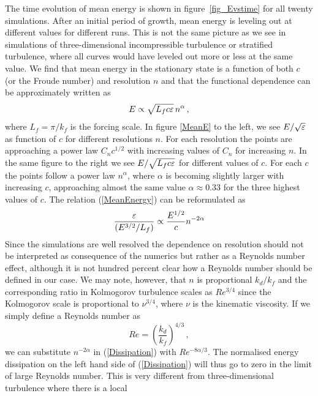 The time evolution of mean energy is shown in figure~\ref{fig_Evstime} for all
twenty simulations. After an initial period of growth, mean energy is leveling
out at different values for different runs. This is not the same picture as we
see in simulations of three-dimensional incompressible turbulence or stratified
turbulence, where all curves would have leveled out more or less at the same
value. We find that mean energy in the stationary state is a function of both $
c $ (or the Froude number) and resolution $ n $ and that the functional
dependence can be approximately written as
\begin{equation} \label{MeanEnergy}
E \propto \sqrt{L_f c \varepsilon} \, n^{\alpha}  \, ,
\end{equation}
where $ L_f = \pi/k_f $ is the forcing scale. In figure \ref{MeanE} to the
left, we see $ E/\sqrt{\varepsilon} $ as function of $ c $ for different resolutions $
n $. For each resolution the points are approaching a power law $ C_n c^{1/2} $
with increasing values of $ C_n $ for increasing $ n $. In the same figure to
the right we see $ E/\sqrt{L_f c \varepsilon} $ for different values of $ c $. For
each $ c $ the points follow a power law $ n^{\alpha} $, where $ \alpha $ is
becoming slightly larger with increasing $ c $, approaching almost the same
value $ \alpha \approx 0.33 $ for the three highest values of $ c $. The
relation (\ref{MeanEnergy}) can be reformulated as
\begin{equation} \label{Dissipation}
\frac{\varepsilon} {(E^{3/2} / L_f)} \propto \frac{E^{1/2}}{c} n^{-2\alpha}
\end{equation}
Since the simulations are well resolved the dependence on resolution should not
be interpreted as consequence of the numerics but rather as a Reynolds number
effect, although it is not hundred percent clear how a Reynolds number should
be defined in our case. We may note, however, that $ n $ is proportional $
k_{d} / k_f $ and the corresponding ratio in Kolmogorov turbulence scales as $
Re^{3/4} $ since the Kolmogorov scale is proportional to $ \nu^{3/4} $, where $
\nu $ is the kinematic viscosity. If we simply define a Reynolds number as
\begin{equation}
Re = \left ( \frac{k_d} {k_f} \right )^{4/3} \, ,
\end{equation}
we can substitute $ n^{-2\alpha} $ in (\ref{Dissipation}) with $ Re^{-8
\alpha/3} $. The normalised energy dissipation on the left hand side of
(\ref{Dissipation}) will thus go to zero in the limit of large Reynolds number.
This is very different from three-dimensional turbulence where there is a local
